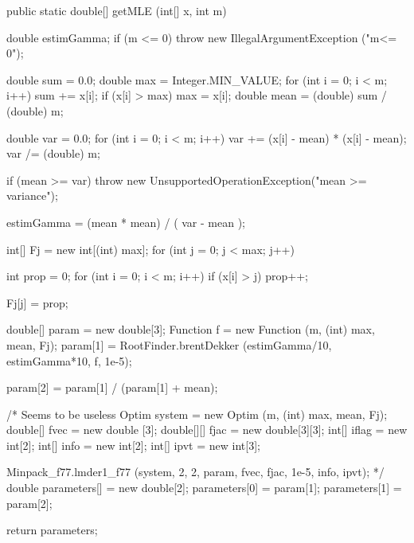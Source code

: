 \begin{htmlonly}
\end{htmlonly}
\begin{code}

   public static double[] getMLE (int[] x, int m)\begin{hide} {
      double estimGamma;
      if (m <= 0)
         throw new IllegalArgumentException ("m<= 0");

      double sum = 0.0;
      double max = Integer.MIN_VALUE;
      for (int i = 0; i < m; i++)
      {
         sum += x[i];
         if (x[i] > max)
            max = x[i];
      }
      double mean = (double) sum / (double) m;

      double var = 0.0;
      for (int i = 0; i < m; i++)
         var += (x[i] - mean) * (x[i] - mean);
      var /= (double) m;

      if (mean >= var)
          throw new UnsupportedOperationException("mean >= variance");

      estimGamma = (mean * mean) / ( var - mean );

      int[] Fj = new int[(int) max];
      for (int j = 0; j < max; j++)
      {
         int prop = 0;
         for (int i = 0; i < m; i++)
            if (x[i] > j)
               prop++;

         Fj[j] = prop;
      }

      double[] param = new double[3];
      Function f = new Function (m, (int) max, mean, Fj);
      param[1] = RootFinder.brentDekker (estimGamma/10, estimGamma*10, f, 1e-5);

      param[2] = param[1] / (param[1] + mean);

/* Seems to be useless
      Optim system = new Optim (m, (int) max, mean, Fj);
      double[] fvec = new double [3];
      double[][] fjac = new double[3][3];
      int[] iflag = new int[2];
      int[] info = new int[2];
      int[] ipvt = new int[3];

      Minpack_f77.lmder1_f77 (system, 2, 2, param, fvec, fjac, 1e-5, info, ipvt);
*/
      double parameters[] = new double[2];
      parameters[0] = param[1];
      parameters[1] = param[2];

      return parameters;
   }\end{hide}
\end{code}
